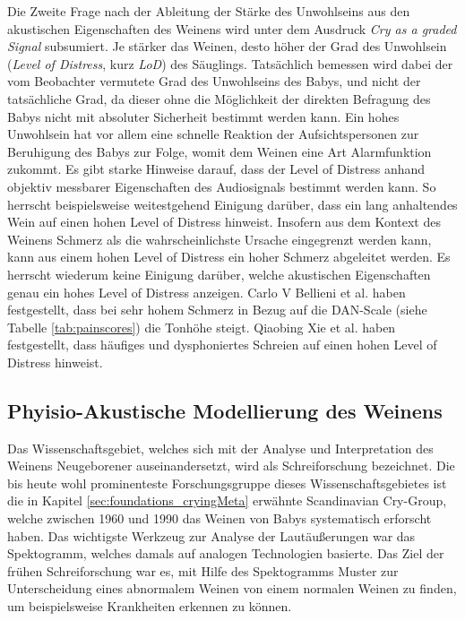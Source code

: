 Die Zweite Frage nach der Ableitung der Stärke des Unwohlseins aus den akustischen Eigenschaften des Weinens wird unter dem Ausdruck \emph{Cry as a graded Signal} subsumiert. Je \glqq stärker\grqq{} das Weinen, desto höher der Grad des Unwohlsein (\emph{Level of Distress}, kurz \emph{LoD}) des Säuglings. Tatsächlich bemessen wird dabei der vom Beobachter vermutete Grad des Unwohlseins des Babys, und nicht der tatsächliche Grad, da dieser ohne die Möglichkeit der direkten Befragung des Babys nicht mit absoluter Sicherheit bestimmt werden kann. Ein hohes Unwohlsein hat vor allem eine schnelle Reaktion der Aufsichtspersonen zur Beruhigung des Babys zur Folge, womit dem Weinen eine Art Alarmfunktion zukommt. Es gibt starke Hinweise darauf, dass der Level of Distress anhand objektiv messbarer Eigenschaften des Audiosignals bestimmt werden kann. So herrscht beispielsweise weitestgehend Einigung darüber, dass ein \glqq lang\grqq{} anhaltendes Wein auf einen hohen Level of Distress hinweist. Insofern aus dem Kontext des Weinens Schmerz als die wahrscheinlichste Ursache eingegrenzt werden kann, kann aus einem hohen Level of Distress ein hoher Schmerz abgeleitet werden.\cite[S. 13 - 17]{signal}\cite{lod} Es herrscht wiederum keine Einigung darüber, welche akustischen Eigenschaften genau ein hohes Level of Distress anzeigen. Carlo V Bellieni et al. \cite{dan} haben festgestellt, dass bei sehr hohem Schmerz in Bezug auf die DAN-Scale (siehe Tabelle \ref{tab:painscores}) die Tonhöhe steigt. Qiaobing Xie et al. \cite{lod} haben festgestellt, dass häufiges und dysphoniertes Schreien auf einen hohen Level of Distress hinweist.

\subsection{Phyisio-Akustische Modellierung des Weinens}
\label{sec:acousticModel}

Das Wissenschaftsgebiet, welches sich mit der Analyse und Interpretation des Weinens Neugeborener auseinandersetzt, wird als \glqq Schreiforschung\grqq{} bezeichnet. Die bis heute wohl prominenteste Forschungsgruppe dieses Wissenschaftsgebietes ist die in Kapitel \ref{sec:foundations_cryingMeta} erwähnte \glqq Scandinavian Cry-Group\grqq \cite{crygroup}, welche zwischen 1960 und 1990 das Weinen von Babys systematisch erforscht haben. Das wichtigste Werkzeug zur Analyse der Lautäußerungen war das Spektogramm, welches damals auf analogen Technologien basierte. Das Ziel der frühen Schreiforschung war es, mit Hilfe des Spektogramms Muster zur Unterscheidung eines abnormalem Weinen von einem normalen Weinen zu finden, um beispielsweise Krankheiten erkennen zu können.\cite[S. 142]{signal} 

